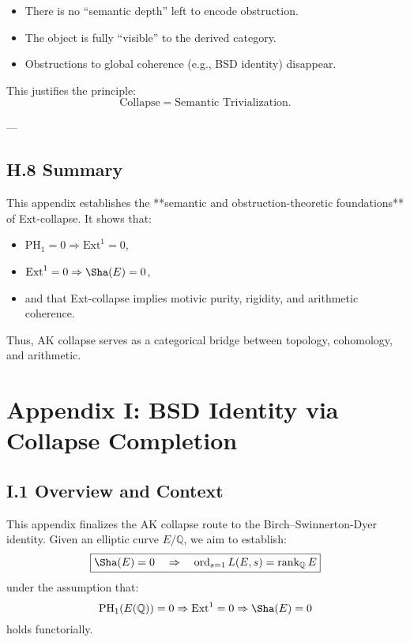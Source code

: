\begin{itemize}
  \item There is no “semantic depth” left to encode obstruction.
  \item The object is fully “visible” to the derived category.
  \item Obstructions to global coherence (e.g., BSD identity) disappear.
\end{itemize}

This justifies the principle:
\[
\text{Collapse} = \text{Semantic Trivialization}.
\]

---

\subsection*{H.8 Summary}

This appendix establishes the **semantic and obstruction-theoretic foundations** of Ext-collapse.  
It shows that:
\begin{itemize}
  \item \( \mathrm{PH}_1 = 0 \Rightarrow \mathrm{Ext}^1 = 0 \),
  \item \( \mathrm{Ext}^1 = 0 \Rightarrow \Sha(E) = 0 \),
  \item and that Ext-collapse implies motivic purity, rigidity, and arithmetic coherence.
\end{itemize}

Thus, AK collapse serves as a categorical bridge between topology, cohomology, and arithmetic.





\section*{Appendix I: BSD Identity via Collapse Completion}

\subsection*{I.1 Overview and Context}

This appendix finalizes the AK collapse route to the Birch–Swinnerton-Dyer identity.  
Given an elliptic curve \( E/\mathbb{Q} \), we aim to establish:
\[
\boxed{\Sha(E) = 0 \quad \Rightarrow \quad \operatorname{ord}_{s=1} L(E,s) = \operatorname{rank}_{\mathbb{Q}} E}
\]
under the assumption that:
\[
\mathrm{PH}_1(E(\mathbb{Q})) = 0 \Rightarrow \mathrm{Ext}^1 = 0 \Rightarrow \Sha(E) = 0
\]
holds functorially.

